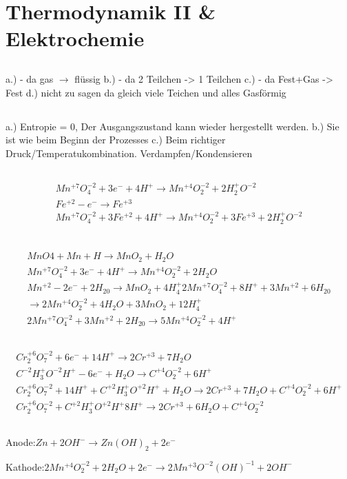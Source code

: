 \documentclass[a4paper]{article}
\begin{document}
\section{Thermodynamik II \& Elektrochemie}
\subsection{}
a.) - da gas $\rightarrow$ flüssig
b.) - da 2 Teilchen -> 1 Teilchen
c.) - da Fest+Gas -> Fest
d.) nicht zu sagen da gleich viele Teichen und alles Gasförmig

\subsection{}
a.) Entropie = 0, Der Ausgangszustand kann wieder hergestellt werden.
b.) Sie ist wie beim Beginn der Prozesses
c.) Beim richtiger Druck/Temperatukombination. Verdampfen/Kondensieren  

\subsection{}
\begin{align}
  Mn^{+7}O_4^{-2} +3 e^- +4 H^+ \rightarrow Mn^{+4}O_2^{-2} +2 H_2^+O^{-2}\\
  Fe^{+2} - e^- \rightarrow Fe^{+3}\\
  Mn^{+7}O_4^{-2} +3 Fe^{+2} +4 H^+ \rightarrow Mn^{+4}O_2^{-2} + 3 Fe^{+3} +2 H_2^+O^{-2}\\
\end{align}

\subsection{}
\begin{align}
  MnO4 + Mn + H \rightarrow MnO_2 + H_2O\\
  Mn^{+7}O_4^{-2} + 3e^- +4H^+ \rightarrow Mn^{+4}O_2^{-2} + 2 H_2O\\
  Mn^{+2} -2e^- + 2H_20 \rightarrow MnO_2 + 4 H_4^+
  2Mn^{+7}O_4^{-2} +8H^+ +3 Mn^{+2} + 6H_20 \\\rightarrow 2Mn^{+4}O_2^{-2} + 4H_2O + 3MnO_2+12H_4^+\\
2Mn^{+7}O_4^{-2} +3 Mn^{+2} + 2H_20 \rightarrow 5Mn^{+4}O_2^{-2} +4 H^+
\end{align}

\subsection{}
\begin{align}
  Cr_2^{+6}O_7^{-2} + 6e^- + 14H^+ \rightarrow 2 Cr^{+3}+ 7H_2O\\
  C^{-2}H_3^+O^{-2}H^+ -6e^- + H_2O   \rightarrow C^{+4}O_2^{-2} + 6H^+\\
Cr_2^{+6}O_7^{-2} +  14H^+ + C^{+2}H_3^+O^{+2}H^+ + H_2O \rightarrow
 2 Cr^{+3}+ 7H_2O + C^{+4}O_2^{-2} + 6H^+\\
Cr_2^{+6}O_7^{-2}  + C^{+2}H_3^+O^{+2}H^+ 8 H^+ \rightarrow
 2 Cr^{+3}+ 6H_2O + C^{+4}O_2^{-2} 
\end{align}
\subsection{}
Anode:$Zn + 2 OH^-  \rightarrow Zn(OH)_2 + 2 e^-$

Kathode:$2Mn^{+4}O_2^{-2} + 2 H_2O  +2 e^- \rightarrow 2 Mn^{+3}O^{-2}(OH)^{-1} + 2 OH^-$
\end{document}
